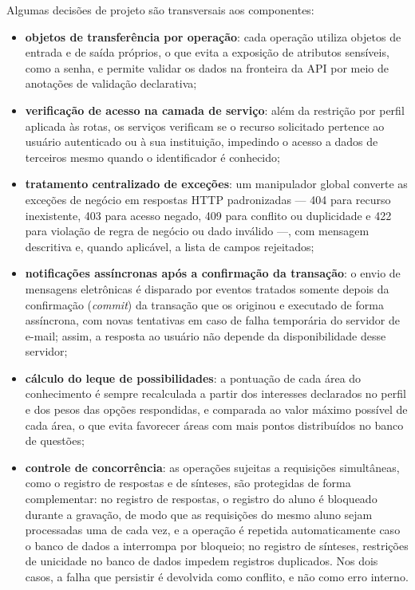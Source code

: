 Algumas decisões de projeto são transversais aos componentes:

\begin{itemize}
  \item \textbf{objetos de transferência por operação}: cada operação utiliza objetos de entrada e de saída próprios, o que evita a exposição de atributos sensíveis, como a senha, e permite validar os dados na fronteira da API por meio de anotações de validação declarativa;
  \item \textbf{verificação de acesso na camada de serviço}: além da restrição por perfil aplicada às rotas, os serviços verificam se o recurso solicitado pertence ao usuário autenticado ou à sua instituição, impedindo o acesso a dados de terceiros mesmo quando o identificador é conhecido;
  \item \textbf{tratamento centralizado de exceções}: um manipulador global converte as exceções de negócio em respostas HTTP padronizadas — 404 para recurso inexistente, 403 para acesso negado, 409 para conflito ou duplicidade e 422 para violação de regra de negócio ou dado inválido —, com mensagem descritiva e, quando aplicável, a lista de campos rejeitados;
  \item \textbf{notificações assíncronas após a confirmação da transação}: o envio de mensagens eletrônicas é disparado por eventos tratados somente depois da confirmação (\textit{commit}) da transação que os originou e executado de forma assíncrona, com novas tentativas em caso de falha temporária do servidor de e-mail; assim, a resposta ao usuário não depende da disponibilidade desse servidor;
  \item \textbf{cálculo do leque de possibilidades}: a pontuação de cada área do conhecimento é sempre recalculada a partir dos interesses declarados no perfil e dos pesos das opções respondidas, e comparada ao valor máximo possível de cada área, o que evita favorecer áreas com mais pontos distribuídos no banco de questões;
  \item \textbf{controle de concorrência}: as operações sujeitas a requisições simultâneas, como o registro de respostas e de sínteses, são protegidas de forma complementar: no registro de respostas, o registro do aluno é bloqueado durante a gravação, de modo que as requisições do mesmo aluno sejam processadas uma de cada vez, e a operação é repetida automaticamente caso o banco de dados a interrompa por bloqueio; no registro de sínteses, restrições de unicidade no banco de dados impedem registros duplicados. Nos dois casos, a falha que persistir é devolvida como conflito, e não como erro interno.
\end{itemize}

